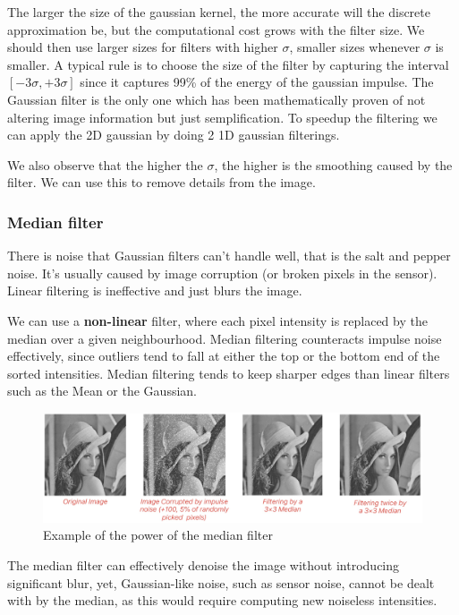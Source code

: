 \documentclass{article}
\begin{document}
The larger the size of the gaussian kernel, the more accurate will the discrete approximation be, but the computational cost grows with the filter size.
We should then use larger sizes for filters with higher $\sigma$, smaller sizes whenever $\sigma$ is smaller.
A typical rule is to choose the size of the filter by capturing the interval $[-3\sigma, +3\sigma]$ since it captures 99\% of the energy of the gaussian impulse.
The Gaussian filter is the only one which has been mathematically proven of not altering image information but just semplification.
To speedup the filtering we can apply the 2D gaussian by doing 2 1D gaussian filterings.

We also observe that the higher the $\sigma$, the higher is the smoothing caused by the filter.
We can use this to remove details from the image.

\subsubsection{Median filter}

There is noise that Gaussian filters can't handle well, that is the salt and pepper noise. It's usually caused by image corruption (or broken pixels in the sensor).
Linear filtering is ineffective and just blurs the image.

We can use a \textbf{non-linear} filter, where each pixel intensity is replaced by the median over a given neighbourhood.
Median filtering counteracts impulse noise effectively, since outliers tend to fall at either the top or the bottom end of the sorted intensities.
Median filtering tends to keep sharper edges than linear filters such as the Mean or the Gaussian.

\begin{figure}[htbp]
  \centering
  \includegraphics[width=0.7\linewidth]{./img/median_filter_application.jpg}
  \caption{Example of the power of the median filter}
  \label{fig:median_filter_application}
\end{figure}

The median filter can effectively denoise the image without introducing significant blur, yet, Gaussian-like noise, such as sensor noise, cannot be dealt with by the median, as this would require computing new noiseless intensities.
\end{document}
